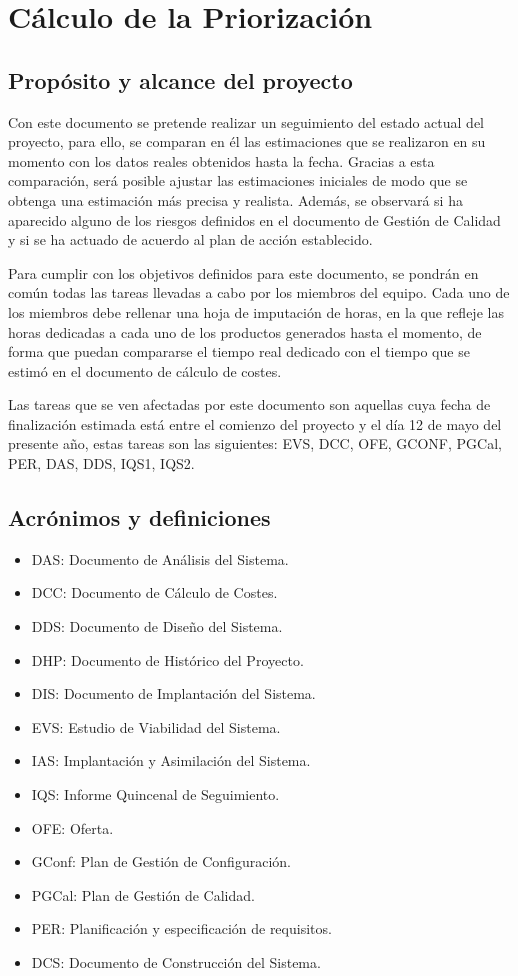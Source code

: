 \section{Cálculo de la Priorización}

\subsection{Propósito y alcance del proyecto}
\par Con este documento se pretende realizar un seguimiento del estado actual del proyecto, para ello, se comparan en él las estimaciones que se realizaron en su momento con los datos reales obtenidos hasta la fecha. Gracias a esta comparación, será posible ajustar las estimaciones iniciales de modo que se obtenga una estimación más precisa y realista. Además, se observará si ha aparecido alguno de los riesgos definidos en el documento de Gestión de Calidad y si se ha actuado de acuerdo al plan de acción establecido.

Para cumplir con los objetivos definidos para este documento, se pondrán en común todas las tareas llevadas a cabo por los miembros del equipo. Cada uno de los miembros debe rellenar una hoja de imputación de horas, en la que refleje las horas dedicadas a cada uno de los productos generados hasta el momento, de forma que puedan compararse el tiempo real dedicado con el tiempo que se estimó en el documento de cálculo de costes.

Las tareas que se ven afectadas por este documento son aquellas cuya fecha de finalización estimada está entre el comienzo del proyecto y el día 12 de mayo del presente año, estas tareas son las siguientes: EVS, DCC, OFE, GCONF, PGCal, PER, DAS, DDS, IQS1, IQS2. 

\subsection{Acrónimos y definiciones}
\begin{itemize}[-]
  \item DAS: Documento de Análisis del Sistema.
  \item DCC: Documento de Cálculo de Costes.
  \item DDS: Documento de Diseño del Sistema.
  \item DHP: Documento de Histórico del Proyecto.
  \item DIS: Documento de Implantación del Sistema.
  \item EVS: Estudio de Viabilidad del Sistema.
  \item IAS: Implantación y Asimilación del Sistema.
  \item IQS: Informe Quincenal de Seguimiento.
  \item OFE: Oferta.
  \item GConf: Plan de Gestión de Configuración.
  \item PGCal: Plan de Gestión de Calidad.
  \item PER: Planificación y especificación de requisitos.
  \item  DCS: Documento de Construcción del Sistema.
\end{itemize}
